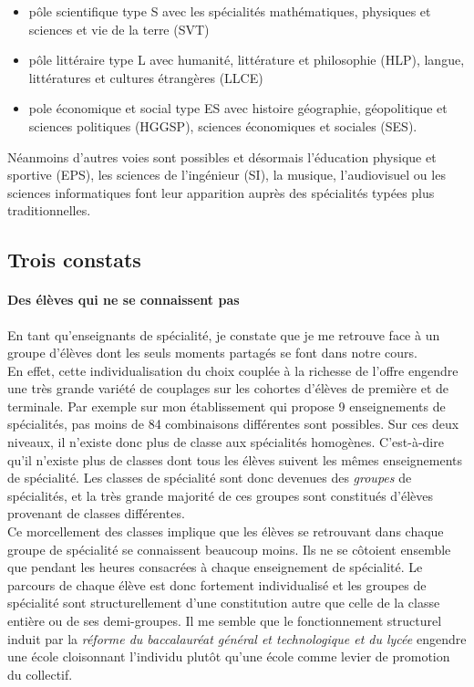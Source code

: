 \begin{itemize}
    \item pôle scientifique type S avec les spécialités mathématiques, physiques et sciences et vie de la terre (SVT)
    \item pôle littéraire type L avec humanité, littérature et philosophie (HLP), langue, littératures et cultures étrangères (LLCE)
    \item pole économique et social type ES avec histoire géographie, géopolitique et sciences politiques (HGGSP), sciences économiques et sociales (SES).
\end{itemize}

Néanmoins d'autres voies sont possibles et désormais l'éducation physique et sportive (EPS), les sciences de l'ingénieur (SI), la musique, l'audiovisuel ou les sciences informatiques font leur apparition auprès des spécialités typées plus traditionnelles.


\subsection{Trois constats}


\paragraph{Des élèves qui ne se connaissent pas} 
En tant qu'enseignants de spécialité, je constate que je me retrouve face à un groupe d'élèves dont les seuls moments partagés se font dans notre cours. 
\\
En effet, cette individualisation du choix couplée à la richesse de l'offre engendre une très grande variété de couplages sur les cohortes d'élèves de première et de terminale. Par exemple sur mon établissement qui propose 9 enseignements de spécialités, pas moins de 84 combinaisons différentes sont possibles. Sur ces deux niveaux, il n'existe donc plus de classe aux spécialités homogènes. C'est-à-dire qu'il n'existe plus de classes dont tous les élèves suivent les mêmes enseignements de spécialité. Les classes de spécialité sont donc devenues des \emph{groupes} de spécialités, et la très grande majorité de ces groupes sont constitués d'élèves provenant de classes différentes.
\\
Ce morcellement des classes implique que les élèves se retrouvant dans chaque groupe de spécialité se connaissent beaucoup moins. Ils ne se côtoient ensemble que pendant les heures consacrées à chaque enseignement de spécialité. Le parcours de chaque élève est donc fortement individualisé et les groupes de spécialité sont structurellement d'une constitution autre que celle de la classe entière ou de ses demi-groupes. Il me semble que le fonctionnement structurel induit par la \emph{réforme du baccalauréat général et technologique et du lycée} engendre une école cloisonnant l'individu plutôt qu'une école comme levier de promotion du collectif. 

